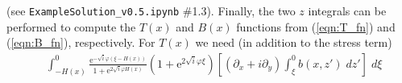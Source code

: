 \documentclass[10pt]{amsart}
\begin{document}
 (see \texttt{ExampleSolution\_v0.5.ipynb} \#1.3).
 Finally, the two $z$ integrals can be performed to compute the $T(x)$ and $B(x)$  functions from (\ref{eqn:T_fn}) and (\ref{eqn:B_fn}), respectively.
 For $T(x)$ we need (in addition to the stress term)
 \begin{align}
& \int_{-H(x)}^{0} 
\frac{ \mathrm{e}^{-\sqrt{i} \varphi (\xi - H(x))  } }{ 1 + \mathrm{e}^{2 \sqrt{i} \varphi H \left(x \right)} }
\left( 1 + \mathrm{e}^{2 \sqrt{i} \varphi \xi}\right) 
 \left[ \left(\partial_x  + i \partial_y\right)  \int_{\xi}^{0} b(x,z') \; dz'   \right] \; d \xi  \nonumber \\

\end{align}
\end{document}
